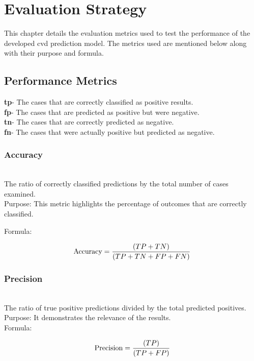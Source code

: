 \section{Evaluation Strategy }
\label{sec:eval}

This chapter details the evaluation metrics used to test the performance of the developed \gls{cvd} prediction model. The metrics used are mentioned below along with their purpose and formula.

\subsection{Performance Metrics}
\label{sec:eval_1}
\textbf{\gls{tp}}- The cases that are correctly classified as positive results. \\
\textbf{\gls{fp}}- The cases that are predicted as positive but were negative. \\
\textbf{\gls{tn}}- The cases that are correctly predicted as negative. \\
\textbf{\gls{fn}}- The cases that were actually positive but predicted as negative.\\

\subsubsection{Accuracy} \leavevmode
\label{sec:eval_2}
\\The ratio of correctly classified predictions by the total number of cases examined. \\
Purpose: This metric highlights the percentage of outcomes that are correctly classified. \citep{devi2021deep}

\noindent Formula: \vspace{-1.9 em}
\begin{center}
 \[
\text{Accuracy} = \frac{(TP + TN)}{(TP + TN + FP + FN)}  \vspace{0.3 cm}
\]
\end{center}


\subsubsection{Precision} \leavevmode
\label{sec:eval_2}
\\The ratio of true positive predictions divided by the total predicted positives. \\
Purpose: It demonstrates the relevance of the results. \\
\noindent Formula: \vspace{-1.9 em}
\begin{center}
 \[
\text{Precision} = \frac{(TP)}{(TP + FP)} \vspace{0.3cm}
\]
\end{center}  

